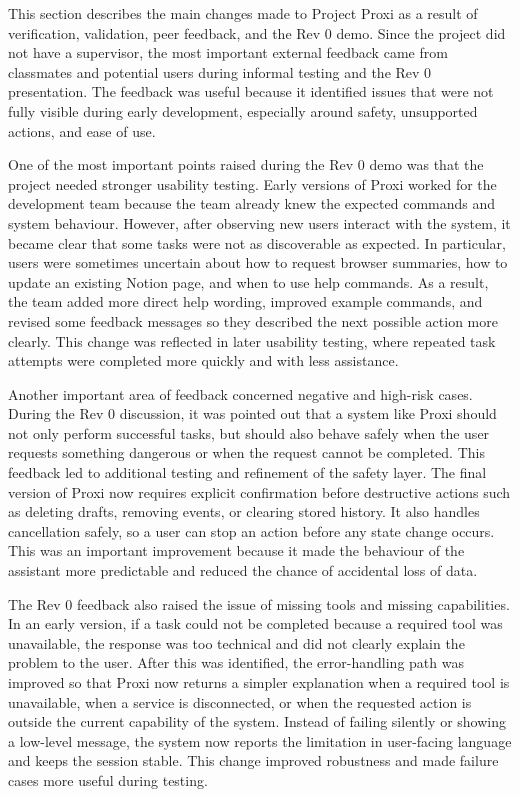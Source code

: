 \documentclass[12pt]{article}
\begin{document}
This section describes the main changes made to Project Proxi as a
result of verification, validation, peer feedback, and the Rev 0
demo. Since the project did not have a supervisor, the most important
external feedback came from classmates and potential users during
informal testing and the Rev 0 presentation. The feedback was useful
because it identified issues that were not fully visible during early
development, especially around safety, unsupported actions, and ease
of use.

One of the most important points raised during the Rev 0 demo was that
the project needed stronger usability testing. Early versions of Proxi
worked for the development team because the team already knew the
expected commands and system behaviour. However, after observing new
users interact with the system, it became clear that some tasks were
not as discoverable as expected. In particular, users were sometimes
uncertain about how to request browser summaries, how to update an
existing Notion page, and when to use help commands. As a result, the
team added more direct help wording, improved example commands, and
revised some feedback messages so they described the next possible
action more clearly. This change was reflected in later usability
testing, where repeated task attempts were completed more quickly and
with less assistance.

Another important area of feedback concerned negative and high-risk
cases. During the Rev 0 discussion, it was pointed out that a system
like Proxi should not only perform successful tasks, but should also
behave safely when the user requests something dangerous or when the
request cannot be completed. This feedback led to additional testing
and refinement of the safety layer. The final version of Proxi now
requires explicit confirmation before destructive actions such as
deleting drafts, removing events, or clearing stored history. It also
handles cancellation safely, so a user can stop an action before any
state change occurs. This was an important improvement because it made
the behaviour of the assistant more predictable and reduced the chance
of accidental loss of data.

The Rev 0 feedback also raised the issue of missing tools and missing
capabilities. In an early version, if a task could not be completed
because a required tool was unavailable, the response was too technical
and did not clearly explain the problem to the user. After this was
identified, the error-handling path was improved so that Proxi now
returns a simpler explanation when a required tool is unavailable, when
a service is disconnected, or when the requested action is outside the
current capability of the system. Instead of failing silently or
showing a low-level message, the system now reports the limitation in
user-facing language and keeps the session stable. This change improved
robustness and made failure cases more useful during testing.
\end{document}
